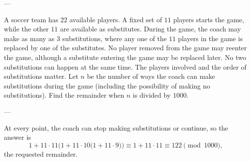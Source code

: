 
---

A soccer team has $22$ available players. A fixed set of $11$ players starts the game, while the other $11$ are available as substitutes. During the game, the coach may make as many as $3$ substitutions, where any one of the $11$ players in the game is replaced by one of the substitutes. No player removed from the game may reenter the game, although a substitute entering the game may be replaced later. No two substitutions can happen at the same time. The players involved and the order of substitutions matter. Let $n$ be the number of ways the coach can make substitutions during the game (including the possibility of making no substitutions). Find the remainder when $n$ is divided by $1000$.

---

At every point, the coach can stop making substitutions or continue, so the answer is \[1+11\cdot 11\Big(1+11\cdot 10\big(1+11\cdot 9\big)\Big)\equiv 1+11\cdot 11\equiv 122\pmod{1000},\]
the requested remainder.

